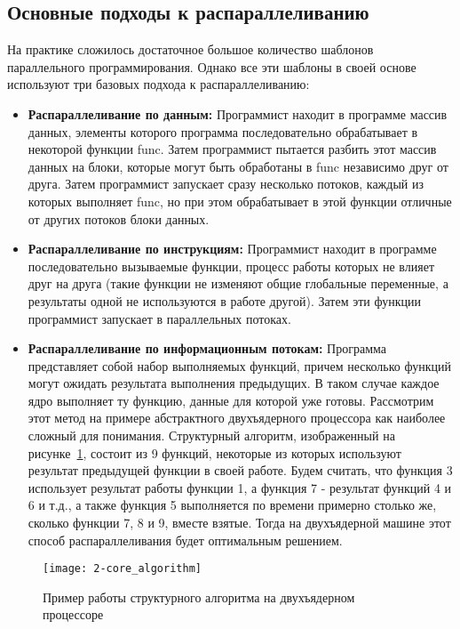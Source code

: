 \subsection{Основные подходы к распараллеливанию}
\label{subsec:parallelization-approaches}

На практике сложилось достаточное большое количество шаблонов параллельного программирования.
Однако все эти шаблоны в своей основе используют три базовых подхода к распараллеливанию:

\begin{itemize}
    \item\textbf{Распараллеливание по данным:} Программист находит в программе массив данных, элементы которого программа последовательно обрабатывает в некоторой функции func.
    Затем программист пытается разбить этот массив данных на блоки, которые могут быть обработаны в func независимо друг от друга.
    Затем программист запускает сразу несколько потоков, каждый из которых выполняет func, но при этом обрабатывает в этой функции отличные от других потоков блоки данных.
    \item\textbf{Распараллеливание по инструкциям:} Программист находит в программе последовательно вызываемые функции, процесс работы которых не влияет друг на друга (такие функции не изменяют общие глобальные переменные, а результаты одной не используются в работе другой).
    Затем эти функции программист запускает в параллельных потоках.
    \item\textbf{Распараллеливание по информационным потокам:} Программа представляет собой набор выполняемых функций, причем несколько функций могут ожидать результата выполнения предыдущих.
    В таком случае каждое ядро выполняет ту функцию, данные для которой уже готовы.
    Рассмотрим этот метод на примере абстрактного двухъядерного процессора как наиболее сложный для понимания.
    Структурный алгоритм, изображенный на рисунке~\ref{fig:2-core-algorithm}, состоит из 9 функций, некоторые из которых используют результат предыдущей функции в своей работе.
    Будем считать, что функция 3 использует результат работы функции 1, а функция 7 - результат функций 4 и 6 и т.д., а также функция 5 выполняется по времени примерно столько же, сколько функции 7, 8 и 9, вместе взятые.
    Тогда на двухъядерной машине этот способ распараллеливания будет оптимальным решением.
\end{itemize}

\begin{figure}[H]
    \texttt{[image: 2-core\_algorithm]}
    \caption{Пример работы структурного алгоритма на двухъядерном процессоре}
    \label{fig:2-core-algorithm}
\end{figure}

